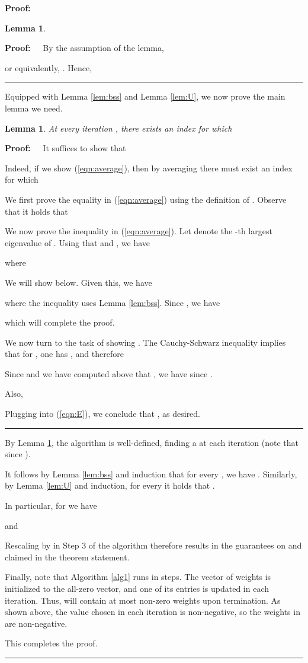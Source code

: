 \documentclass[11pt]{article}
\newtheorem{lemma}[theorem]{Lemma}
\newenvironment{proof}{\begin{trivlist} \item {\bf Proof:~~}}
  {\qed\end{trivlist}}
\def\qed{\hfill\rule{2mm}{2mm}}
\begin{document}
\begin{proof}
\begin{lemma}
\end{lemma}
\begin{proof}
By the assumption of the lemma, 

or equivalently, . Hence, 

\end{proof}
Equipped with Lemma \ref{lem:bss} and Lemma \ref{lem:U}, we now prove the main lemma we need.

\begin{lemma}\label{lem:sandwich}
At every iteration , there exists an index 
for which 

\end{lemma}
\begin{proof}
It suffices to show that

Indeed, if we show (\ref{eqn:average}), then by averaging there must exist an index  for which

We first prove the equality in (\ref{eqn:average}) using the definition of . Observe that
it holds that 

We now prove the inequality in (\ref{eqn:average}). Let  denote the -th
largest eigenvalue of . 
Using that  and ,
we have

where

We will show  below. Given this, we have

where the inequality uses Lemma \ref{lem:bss}. Since , we 
have 

which will complete the proof. 

We now turn to the task of showing . The Cauchy-Schwarz inequality implies
that for , one has , 
and therefore

Since  and we have computed above that , 
we have 
since . 

Also, 

Plugging into (\ref{eqn:E}), we conclude that , as desired. 
\end{proof}

By Lemma \ref{lem:sandwich}, the algorithm is well-defined, finding a  at each iteration
(note that  since ). 

It follows by Lemma \ref{lem:bss} and induction that for every , we have . 
Similarly, by
Lemma \ref{lem:U} and induction, for every  it holds that . 

In particular, for  we have

and

Rescaling by  in Step 3 of the algorithm therefore results in the guarantees on 
and  claimed in the theorem statement. 

Finally, note that Algorithm \ref{alg1} runs in  steps. 
The vector  of weights is initialized to the all-zero 
vector, and one of its entries is updated in each iteration. Thus,  will contain at most 
non-zero weights upon termination. As shown above, the value  chosen in each iteration 
is non-negative, so the weights in  are non-negative.

This completes the proof. 
\end{proof}
\end{document}
